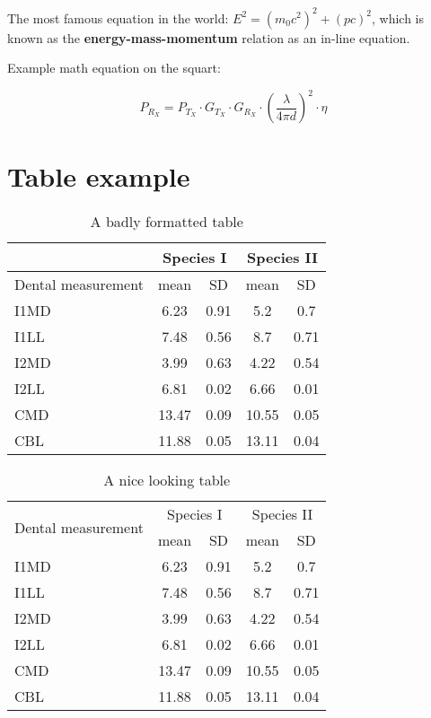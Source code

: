 The most famous equation in the world: $E^2 = (m_0c^2)^2 + (pc)^2$, which is 
known as the \textbf{energy-mass-momentum} relation as an in-line equation.


Example math equation on the squart:

\begin{equation}
P_{R_X} = P_{T_X} \cdot G_{T_X}  \cdot G_{R_X} \cdot \left( \frac{\lambda}{4\pi d} \right)^2  \cdot \eta
\end{equation}



\section{Table example}

\begin{table}[H]
\caption{A badly formatted table}
\centering
\label{table:bad_table}
\begin{tabular}{|l|c|c|c|c|}
\hline 
& \multicolumn{2}{c}{Species I} & \multicolumn{2}{c|}{Species II} \\ 
\hline
Dental measurement  & mean & SD  & mean & SD  \\ \hline 
\hline
I1MD & 6.23 & 0.91 & 5.2  & 0.7  \\
\hline 
I1LL & 7.48 & 0.56 & 8.7  & 0.71 \\
\hline 
I2MD & 3.99 & 0.63 & 4.22 & 0.54 \\
\hline 
I2LL & 6.81 & 0.02 & 6.66 & 0.01 \\
\hline 
CMD & 13.47 & 0.09 & 10.55 & 0.05 \\
\hline 
CBL & 11.88 & 0.05 & 13.11 & 0.04\\ 
\hline 
\end{tabular}
\end{table}



\begin{table}[H]
\caption{A nice looking table}
\centering
\label{table:nice_table}
\begin{tabular}{l c c c c}
\hline 
\multirow{2}{*}{Dental measurement} & \multicolumn{2}{c}{Species I} & \multicolumn{2}{c}{Species II} \\ 
\cline{2-5}
  & mean & SD  & mean & SD  \\ 
\hline
I1MD & 6.23 & 0.91 & 5.2  & 0.7  \\

I1LL & 7.48 & 0.56 & 8.7  & 0.71 \\

I2MD & 3.99 & 0.63 & 4.22 & 0.54 \\

I2LL & 6.81 & 0.02 & 6.66 & 0.01 \\

CMD & 13.47 & 0.09 & 10.55 & 0.05 \\

CBL & 11.88 & 0.05 & 13.11 & 0.04\\ 
\hline 
\end{tabular}
\end{table}


